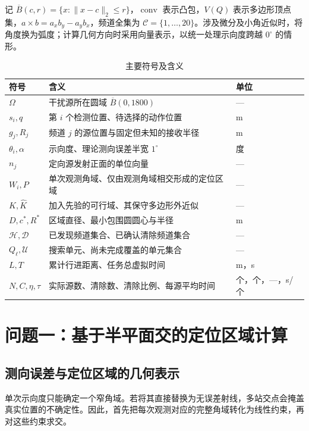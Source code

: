 \documentclass[withoutpreface,bwprint]{cumcmthesis} %
\begin{document}
记 $\overline B(c,r)=\{x:\|x-c\|_2\leq r\}$，$\operatorname{conv}$ 表示凸包，$V(Q)$ 表示多边形顶点集，$a\times b=a_xb_y-a_yb_x$，频道全集为 $\mathcal C=\{1,\ldots,20\}$。涉及微分及小角近似时，将角度换为弧度；计算几何方向时采用向量表示，以统一处理示向度跨越 $0^\circ$ 的情形。
\begin{table}[htbp]
\centering
\caption{主要符号及含义}\label{tab:notation}
\begin{tabularx}{\linewidth}{p{2.0cm}X>{\centering\arraybackslash}p{2.0cm}}
\toprule
符号 & 含义 & 单位\\
\midrule
$\Omega$ & 干扰源所在圆域 $\overline B(0,1800)$ & ---\\
$s_i,q$ & 第 $i$ 个检测位置、待选择的动作位置 & m\\
$g_j,R_j$ & 频道 $j$ 的源位置与固定但未知的接收半径 & m\\
$\theta_i,\alpha$ & 示向度、理论测向误差半宽 $1^\circ$ & 度\\
$n_j$ & 定向源发射正面的单位向量 & ---\\
$W_i,P$ & 单次观测角域、仅由观测角域相交形成的定位区域 & ---\\
$K,\widehat K$ & 加入先验的可行域、其保守多边形外近似 & ---\\
$D,c^*,R^*$ & 区域直径、最小包围圆圆心与半径 & m\\
$\mathcal H,\mathcal D$ & 已发现频道集合、已确认清除频道集合 & ---\\
$Q_\ell,\mathcal U$ & 搜索单元、尚未完成覆盖的单元集合 & ---\\
$L,T$ & 累计行进距离、任务总虚拟时间 & m，s\\
$N,C,\eta,\tau$ & 实际源数、清除数、清除比例、每源平均时间 & 个，个，---，s/个\\
\bottomrule
\end{tabularx}
\end{table}


\section{问题一：基于半平面交的定位区域计算}
\subsection{测向误差与定位区域的几何表示}
单次示向度只能确定一个窄角域。若将其直接替换为无误差射线，多站交点会掩盖真实位置的不确定性。因此，首先把每次观测对应的完整角域转化为线性约束，再对这些约束求交。
\end{document}
